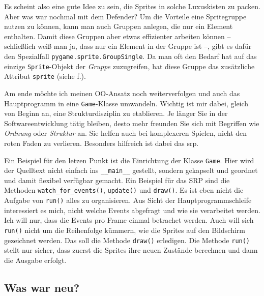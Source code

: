 Es scheint also eine gute Idee zu sein, die Sprites in solche Luxuskisten zu packen. Aber was war nochmal mit dem Defender? Um die Vorteile eine Spritegruppe nutzen zu können, kann man auch Gruppen anlegen, die nur ein Element enthalten. Damit diese Gruppen aber etwas effizienter arbeiten können -- schließlich weiß man ja, dass nur ein Element in der Gruppe ist --, gibt es dafür den Spezialfall \texttt{pygame.sprite.GroupSingle}. Da man oft den Bedarf hat auf das einzige \texttt{Sprite}-Objekt der \emph{Gruppe} zuzugreifen, hat diese Gruppe das zusätzliche Attribut \texttt{sprite} (siehe f.).


Am ende möchte ich meinen OO-Ansatz noch weiterverfolgen und auch das Hauptprogramm in eine \texttt{Game}-Klasse umwandeln. Wichtig ist mir dabei, gleich von Beginn an, eine Strukturdisziplin zu etablieren. Je länger Sie in der Softwareentwicklung tätig bleiben, desto mehr freunden Sie sich mit Begriffen wie \emph{Ordnung} oder \emph{Struktur} an. Sie helfen auch bei komplexeren Spielen, nicht den roten Faden zu verlieren. Besonders hilfreich ist dabei das \Gls{srp}.


Ein Beispiel für den letzen Punkt ist die Einrichtung der Klasse \texttt{Game}. Hier wird der Quelltext nicht einfach ins \texttt{\_\_main\_\_} gestellt, sondern gekapselt und geordnet und damit flexibel verfügbar gemacht. Ein Beispiel für das SRP sind die Methoden \texttt{watch\_for\_e\-vents()}, \texttt{update()} und \texttt{draw()}. Es ist eben nicht die Aufgabe von \texttt{run()} alles zu organisieren. Aus Sicht der Hauptprogrammschleife interessiert es mich, nicht welche Events abgefragt und wie sie verarbeitet werden. Ich will nur, dass die Events pro Frame einmal betrachet werden. Auch will sich \texttt{run()} nicht um die Reihenfolge kümmern, wie die Sprites auf den Bildschirm gezeichnet werden. Das soll die Methode \texttt{draw()} erledigen. Die Methode \texttt{run()} stellt nur sicher, dass zuerst die Sprites ihre neuen Zustände berechnen und dann die Ausgabe erfolgt.

\subsection*{Was war neu?}

